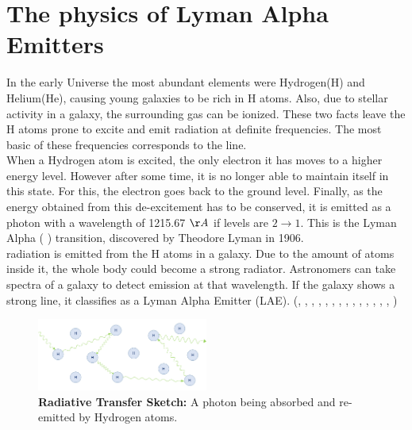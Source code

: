 \documentclass{latex/emulateapj}
\begin{document}
\section{The physics of Lyman Alpha Emitters}
\label{sec1:laes}
In the early Universe the most abundant elements were Hydrogen(H) and Helium(He), causing young galaxies to be rich in H atoms. Also, due to stellar activity in a galaxy, the surrounding gas can be ionized. These two facts leave the H atoms prone to excite and emit radiation at definite frequencies. The most basic of these frequencies corresponds to the \lya line. \cite{PartridgePeebles}  \\

When a Hydrogen atom is excited, the only electron it has moves to a higher energy level. However after some time, it is no longer able to maintain itself in this state. For this, the electron goes back to the ground level. Finally, as the energy obtained from this de-excitement has to be conserved, it is emitted as a photon with a wavelength of 1215.67 $\AA$ if levels are $2\rightarrow1$. This is the Lyman Alpha ( \lya) transition, discovered by Theodore Lyman in 1906. \cite{LymanBio} \\

\lya radiation is emitted from the H atoms in a galaxy. Due to the amount of atoms inside it, the whole body could become a strong \lya radiator. Astronomers can take spectra of a galaxy to detect emission at that wavelength. If the galaxy shows a strong \lya line, it classifies as a Lyman Alpha Emitter (LAE). (\cite{DjorgovskiThompson}, \cite{Rhoads00}, \cite{Gawiser2007}, \cite{Koehler2007}, \cite{Ouchi08}, \cite{Yamada2012}, \cite{Schenker2012}, \cite{Kulas12}, \cite{Yamada2012}, \cite{Chonis2013}, \cite{Finkelstein2013}, \cite{Ostlin14}, \cite{Hayes2014}, \cite{Faisst2014}, \cite{Fumagalli2015}) \\

\begin{figure}[h!]
	\begin{center}
		\includegraphics[width=0.5\textwidth]{./figures/radiative_transfer}
	\end{center}
	\caption{\textbf{Radiative Transfer Sketch:} A \lya photon being absorbed and re-emitted by Hydrogen atoms. 
		\label{fig:radiative_transfer}}
\end{figure}
\end{document}

